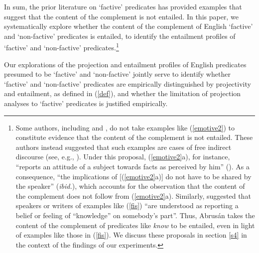 \documentclass[11pt,fleqn]{article}
\newcommand{\6}{\mbox{$[\hspace*{-.6mm}[$}}
\newcommand{\9}{\mbox{$]\hspace*{-.6mm}]$}}
\begin{document}
In sum, the prior literature on `factive' predicates has provided examples that suggest that the content of the complement is not entailed. In this paper, we systematically explore whether the content of the complement of English `factive' and `non-factive' predicates is entailed, to identify the entailment profiles of `factive' and `non-factive' predicates.\footnote{Some authors, including \citet{gazdar79a} and \citet{abrusan2011}, do not take examples like (\ref{emotive2}) to constitute evidence that the content of the complement is not entailed. These authors instead suggested that such examples are cases of free indirect discourse (see, e.g., \citealt{eckardt2014}). Under this proposal, (\ref{emotive2}a), for instance, ``reports an attitude of a subject towards facts as perceived by him'' (\citealt[514]{abrusan2011}). As a consequence, ``the implications of [(\ref{emotive2}a)] do not have to be shared by the speaker''  ({\em ibid.}), which accounts for the observation that the content of the complement does not follow from (\ref{emotive2}a). Similarly, \citet[515]{abrusan2011} suggested that speakers or writers of examples like (\ref{fis}) ``are understood as reporting a belief or feeling of ``knowledge'' on somebody's part''. Thus, Abrus\'an takes the content of the complement of predicates like {\em know} to be entailed, even in light of examples like those in (\ref{fis}). We discuss these proposals in section \ref{s4} in the context of the findings of our experiments.}

%
%
%

Our explorations of the projection and entailment profiles of English predicates presumed to be `factive' and `non-factive' jointly serve to identify whether `factive' and `non-factive' predicates are empirically distinguished by projectivity and entailment, as defined in (\ref{def}), and whether the limitation of projection analyses to `factive' predicates is justified empirically. 
\end{document}
